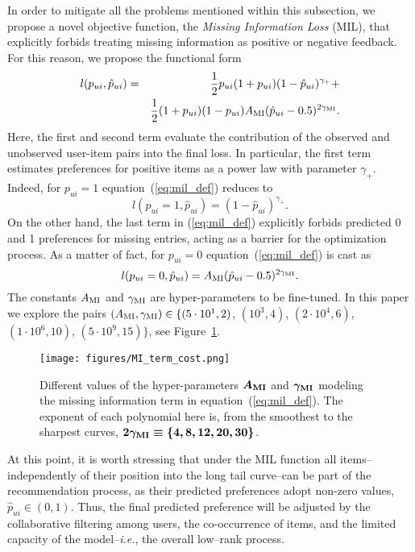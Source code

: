 In order to mitigate all the problems mentioned within this subsection, we propose a novel objective function, the \emph{Missing Information Loss} (MIL), that explicitly forbids treating missing information as positive or negative feedback. For this reason, we propose the functional form
\begin{eqnarray}\label{eq:mil_def}
l(p_{ui},\hat{p}_{ui}) &=& 
\frac{1}{2} p_{ui} (1 + p_{ui}) (1 - \hat{p}_{ui})^{\gamma_{+}} + \nonumber\\
             & & \frac{1}{2} (1+p_{ui})(1-p_{ui}) A_{\rm MI}(\hat{p}_{ui}-0.5)^{2\gamma_{\rm MI}}. 
\end{eqnarray}
Here, the first and second term evaluate the contribution of the observed and unobserved user-item pairs into the final loss.
In particular, the first term estimates preferences for positive items as a power law with parameter $\gamma_+$. Indeed, for $p_{ui}=1$ equation~(\ref{eq:mil_def}) reduces to
\begin{equation*}
l(p_{ui}=1,\hat{p}_{ui}) = (1 - \hat{p}_{ui})^{\gamma_{+}}. 
\end{equation*}
On the other hand, the last term in (\ref{eq:mil_def}) explicitly forbids predicted 0 and 1 preferences for missing entries, acting as a barrier for the optimization process. As a matter of fact, for $p_{ui}=0$ equation~(\ref{eq:mil_def}) is cast as
\begin{equation*}
l(p_{ui}=0,\hat{p}_{ui}) = A_{\rm MI}(\hat{p}_{ui}-0.5)^{2\gamma_{\rm MI}}. 
\end{equation*}
The constants $A_{\rm MI}$ and $\gamma_{\rm MI}$ are hyper-parameters to be fine-tuned. In this paper we explore the pairs $\left(A_{\rm MI}, \gamma_{\rm MI}\right)\in\{
(5\cdot10^1, 2)$, $(10^3, 4)$, $(2\cdot10^4, 6)$, $(1\cdot10^6, 10)$, $(5\cdot10^9, 15)
\}$, see Figure~\ref{fig:mil_parameters}.

\begin{figure}[hbt]
    \centering
    \texttt{[image: figures/MI\_term\_cost.png]}
    \caption{Different values of the hyper-parameters $\boldsymbol{A_{\rm MI}}$ and $\boldsymbol{\gamma_{\rm MI}}$ modeling the missing information term in equation~(\ref{eq:mil_def}). The exponent of each polynomial here is, from the smoothest to the sharpest curves, $\boldsymbol{2 \gamma_{\rm MI}\equiv\{4,8,12,20,30\}}$.
    }
    \label{fig:mil_parameters}
\end{figure}

At this point, it is worth stressing that under the MIL function all items--independently of their position into the long tail curve--can be part of the recommendation process, as their predicted preferences adopt non-zero values, $\hat{p}_{ui}\in(0,1)$.
Thus, the final predicted preference will be adjusted by the collaborative filtering among users, 
the co-occurrence of items, and the limited capacity of the model--\emph{i.e.}, the overall low--rank process.

